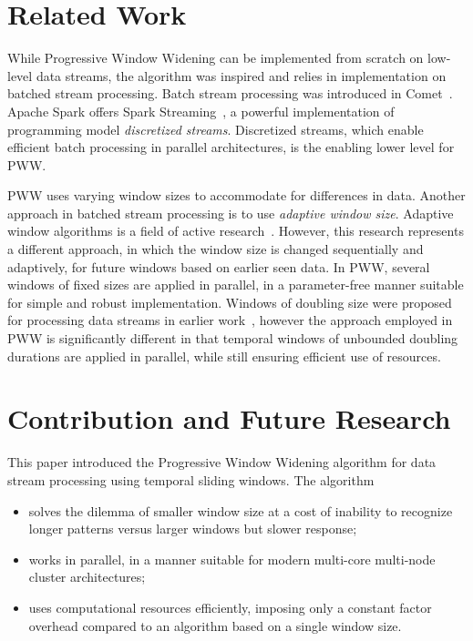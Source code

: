 \documentclass[runningheads,a4paper]{llncs}
\begin{document}
\section{Related Work}
\label{sec:related}

While Progressive Window Widening can be implemented from
scratch on low-level data streams, the algorithm was inspired 
and relies in implementation on batched stream processing. Batch
stream processing was introduced in Comet~\cite{HYZ+10}. Apache
Spark offers Spark Streaming~\cite{ZDL+12,ZDL+13}, a powerful
implementation of programming model \textit{discretized
streams}. Discretized streams, which enable efficient batch
processing in parallel architectures, is the enabling lower
level for PWW. 

PWW uses varying window sizes to accommodate for differences in
data. Another approach in batched stream processing is to use
\textit{adaptive window size}. Adaptive window algorithms is a
field of active research~\cite{ZLZ+04,BG07,BPR+13,YMD13}.
However, this research represents a different approach, in which
the window size is changed sequentially and adaptively, for future
windows based on earlier seen data. In PWW, several windows of
fixed sizes are applied in parallel, in a parameter-free manner
suitable for simple and robust implementation. Windows of
doubling size were proposed for processing data streams in
earlier work~\cite{AHJ03}, however the approach employed in PWW
is significantly different in that temporal windows of unbounded
doubling durations are applied in parallel, while still
ensuring efficient use of resources.

\section{Contribution and Future Research}
\label{sec:contribution}

This paper introduced the Progressive Window Widening algorithm
for data stream processing using temporal sliding windows. The
algorithm
\begin{itemize}
    \item solves the dilemma of smaller window size at a cost
        of inability to recognize longer patterns versus larger
        windows but slower response;
    \item works in parallel, in a manner suitable for modern
        multi-core multi-node cluster architectures;
    \item uses computational resources efficiently, imposing
        only a constant factor overhead compared to an algorithm
        based on a single window size.
\end{itemize}
\end{document}
